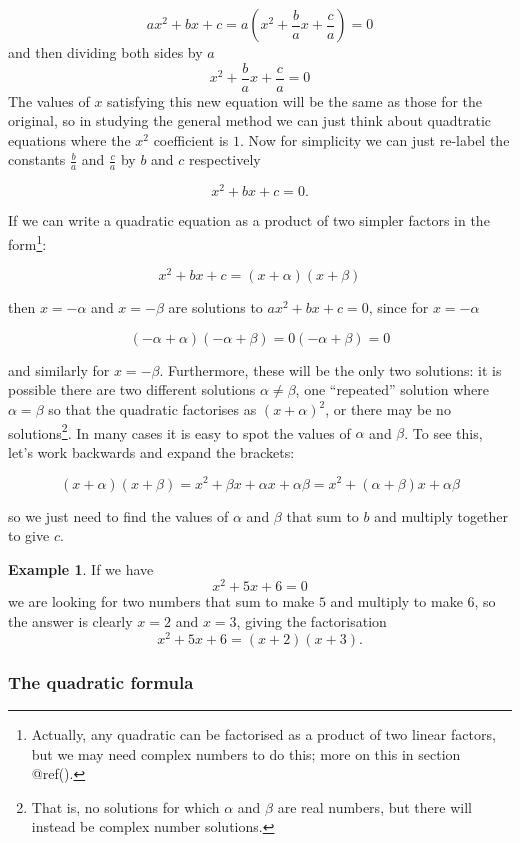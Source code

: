 \documentclass[
]{book}
\theoremstyle{definition}
\theoremstyle{definition}
\newtheorem{example}{Example}[chapter]
\theoremstyle{definition}
\theoremstyle{definition}
\theoremstyle{remark}
\begin{document}
\[ax^2+bx+c=a(x^2+\frac{b}{a}x+\frac{c}{a})=0\]
and then dividing both sides by \(a\)
\[x^2+\frac{b}{a}x+\frac{c}{a}=0\]
The values of \(x\) satisfying this new equation will be the same as those for the original, so in studying the general method we can just think about quadtratic equations where the \(x^2\) coefficient is \(1\). Now for simplicity we can just re-label the constants \(\frac{b}{a}\) and \(\frac{c}{a}\) by \(b\) and \(c\) respectively

\[x^2+bx+c=0.\]

If we can write a quadratic equation as a product of two simpler factors in the form\footnote{Actually, any quadratic can be factorised as a product of two linear factors, but we may need complex numbers to do this; more on this in section @ref().}:

\[x^2+bx+c = (x+\alpha)(x+\beta)\]

then \(x=-\alpha\) and \(x=-\beta\) are solutions to \(ax^2+bx+c=0\), since for \(x=-\alpha\)

\[(-\alpha+\alpha)(-\alpha+\beta)=0(-\alpha+\beta)=0\]

and similarly for \(x=-\beta\). Furthermore, these will be the only two solutions: it is possible there are two different solutions \(\alpha\neq\beta\), one ``repeated'' solution where \(\alpha=\beta\) so that the quadratic factorises as \((x+\alpha)^2\), or there may be no solutions\footnote{That is, no solutions for which \(\alpha\) and \(\beta\) are real numbers, but there will instead be complex number solutions.}. In many cases it is easy to spot the values of \(\alpha\) and \(\beta\). To see this, let's work backwards and expand the brackets:

\[(x+\alpha)(x+\beta)=x^2+\beta x +\alpha x +\alpha\beta = x^2 + (\alpha + \beta)x + \alpha\beta\]

so we just need to find the values of \(\alpha\) and \(\beta\) that sum to \(b\) and multiply together to give \(c\).

\begin{example}
\protect\hypertarget{exm:factorise}{}\label{exm:factorise}If we have
\[x^2+5x+6=0\]
we are looking for two numbers that sum to make \(5\) and multiply to make \(6\), so the answer is clearly \(x=2\) and \(x=3\), giving the factorisation
\[x^2+5x+6=(x+2)(x+3).\]
\end{example}

\hypertarget{the-quadratic-formula}{%
\subsubsection{The quadratic formula}\label{the-quadratic-formula}}
\end{document}

